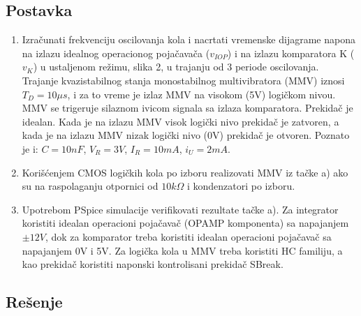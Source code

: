 \documentclass{article}
\begin{document}
            \subsection{Postavka}
                \begin{enumerate}[label=(\alph*)]
                    \item Izračunati frekvenciju oscilovanja kola i nacrtati vremenske dijagrame napona na izlazu idealnog operacionog pojačavača ($v_{IOP}$) i na izlazu komparatora K ($v_K$) u ustaljenom režimu, slika 2, u trajanju od 3 periode oscilovanja. Trajanje kvazistabilnog stanja monostabilnog multivibratora (MMV) iznosi $T_D = 10\mu s$, i za to vreme je izlaz MMV na visokom (5V) logičkom nivou. MMV se trigeruje silaznom ivicom signala sa izlaza komparatora. Prekidač je idealan. Kada je na izlazu MMV visok logički nivo prekidač je zatvoren, a kada je na izlazu MMV nizak logički nivo (0V) prekidač je otvoren. Poznato je i: $C = 10nF$, $V_R = 3V$, $I_R = 10mA$, $i_U = 2mA$.
                    \item Korišćenjem CMOS logičkih kola po izboru realizovati MMV iz tačke a) ako su na raspolaganju otpornici od $10k\Omega$ i kondenzatori po izboru.
                    \item Upotrebom PSpice simulacije verifikovati rezultate tačke a). Za integrator koristiti idealan operacioni pojačavač (OPAMP komponenta) sa napajanjem $\pm 12V$, dok za komparator treba koristiti idealan operacioni pojačavač sa napajanjem 0V i 5V. Za logička kola u MMV treba koristiti HC familiju, a kao prekidač koristiti naponski kontrolisani prekidač SBreak.
                \end{enumerate}

            \subsection{Rešenje}
\end{document}
